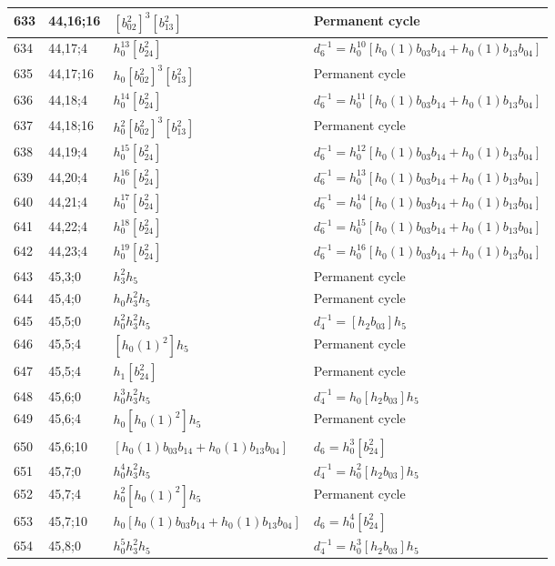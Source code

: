 \documentclass{article}
\begin{document}
\begin{longtable}{|l|l|>{\raggedright\arraybackslash}p{6cm}|>{\raggedright\arraybackslash}p{6cm}|}
\hline
633 & 44,16;16 & $[b_{02}^2]^3[b_{13}^2]$ & Permanent cycle\\
\hline
634 & 44,17;4 & $h_0^{13}[b_{24}^2]$ & $d_{6}^{-1}=h_0^{10}[h_0(1)b_{03}b_{14} + h_0(1)b_{13}b_{04}]$\\
\hline
635 & 44,17;16 & $h_0[b_{02}^2]^3[b_{13}^2]$ & Permanent cycle\\
\hline
636 & 44,18;4 & $h_0^{14}[b_{24}^2]$ & $d_{6}^{-1}=h_0^{11}[h_0(1)b_{03}b_{14} + h_0(1)b_{13}b_{04}]$\\
\hline
637 & 44,18;16 & $h_0^2[b_{02}^2]^3[b_{13}^2]$ & Permanent cycle\\
\hline
638 & 44,19;4 & $h_0^{15}[b_{24}^2]$ & $d_{6}^{-1}=h_0^{12}[h_0(1)b_{03}b_{14} + h_0(1)b_{13}b_{04}]$\\
\hline
639 & 44,20;4 & $h_0^{16}[b_{24}^2]$ & $d_{6}^{-1}=h_0^{13}[h_0(1)b_{03}b_{14} + h_0(1)b_{13}b_{04}]$\\
\hline
640 & 44,21;4 & $h_0^{17}[b_{24}^2]$ & $d_{6}^{-1}=h_0^{14}[h_0(1)b_{03}b_{14} + h_0(1)b_{13}b_{04}]$\\
\hline
641 & 44,22;4 & $h_0^{18}[b_{24}^2]$ & $d_{6}^{-1}=h_0^{15}[h_0(1)b_{03}b_{14} + h_0(1)b_{13}b_{04}]$\\
\hline
642 & 44,23;4 & $h_0^{19}[b_{24}^2]$ & $d_{6}^{-1}=h_0^{16}[h_0(1)b_{03}b_{14} + h_0(1)b_{13}b_{04}]$\\
\hline
643 & 45,3;0 & $h_3^2h_5$ & Permanent cycle\\
\hline
644 & 45,4;0 & $h_0h_3^2h_5$ & Permanent cycle\\
\hline
645 & 45,5;0 & $h_0^2h_3^2h_5$ & $d_{4}^{-1}=[h_2b_{03}]h_5$\\
\hline
646 & 45,5;4 & $[h_0(1)^2]h_5$ & Permanent cycle\\
647 & 45,5;4 & $h_1[b_{24}^2]$ & Permanent cycle\\
\hline
648 & 45,6;0 & $h_0^3h_3^2h_5$ & $d_{4}^{-1}=h_0[h_2b_{03}]h_5$\\
\hline
649 & 45,6;4 & $h_0[h_0(1)^2]h_5$ & Permanent cycle\\
\hline
650 & 45,6;10 & $[h_0(1)b_{03}b_{14} + h_0(1)b_{13}b_{04}]$ &$d_{6}=h_0^3[b_{24}^2]$\\
\hline
651 & 45,7;0 & $h_0^4h_3^2h_5$ & $d_{4}^{-1}=h_0^2[h_2b_{03}]h_5$\\
\hline
652 & 45,7;4 & $h_0^2[h_0(1)^2]h_5$ & Permanent cycle\\
\hline
653 & 45,7;10 & $h_0[h_0(1)b_{03}b_{14} + h_0(1)b_{13}b_{04}]$ &$d_{6}=h_0^4[b_{24}^2]$\\
\hline
654 & 45,8;0 & $h_0^5h_3^2h_5$ & $d_{4}^{-1}=h_0^3[h_2b_{03}]h_5$\\

\end{longtable}
\end{document}
